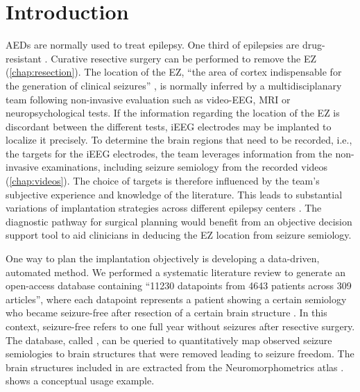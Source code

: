 \section{Introduction}

\Acp{AED} are normally used to treat epilepsy.
One third of epilepsies are drug-resistant \cite{engel_what_2016}.
Curative resective surgery can be performed to remove the \ac{EZ} (\cref{chap:resection}).
The location of the \ac{EZ}, ``the area of cortex indispensable for the generation of clinical seizures'' \cite{rosenow_presurgical_2001}, is normally inferred by a multidisciplanary team following non-invasive evaluation such as video-\ac{EEG}, \ac{MRI} or neuropsychological tests.
If the information regarding the location of the \ac{EZ} is discordant between the different tests, \ac{iEEG} electrodes may be implanted to localize it precisely.
To determine the brain regions that need to be recorded, i.e., the targets for the \ac{iEEG} electrodes, the team leverages information from the non-invasive examinations, including seizure semiology from the recorded videos (\cref{chap:videos}).
The choice of targets is therefore influenced by the team's subjective experience and knowledge of the literature.
This leads to substantial variations of implantation strategies across different epilepsy centers \cite{tufenkjian_seizure_2012}.
The diagnostic pathway for surgical planning would benefit from an objective decision support tool to aid clinicians in deducing the \ac{EZ} location from seizure semiology.

One way to plan the implantation objectively is developing a data-driven, automated method.
We performed a systematic literature review to generate an open-access database containing ``11230 datapoints from 4643 patients across 309 articles'', where each datapoint represents a patient showing a certain semiology who became seizure-free after resection of a certain brain structure \cite{alim-marvasti_probabilistic_2021}.
In this context, seizure-free refers to one full year without seizures after resective surgery.
The database, called \svtdatabase, can be queried to quantitatively map observed seizure semiologies to brain structures that were removed leading to seizure freedom.
The brain structures included in \svtdatabase are extracted from the Neuromorphometrics atlas%
.
 shows a conceptual usage example.

